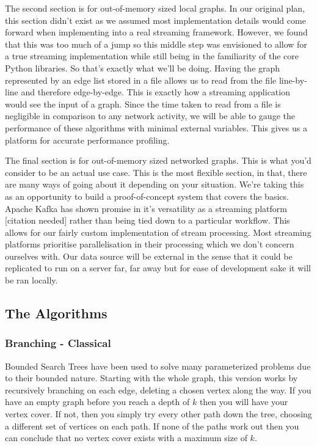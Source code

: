 The second section is for out-of-memory sized local graphs. In our
original plan, this section didn't exist as we assumed most
implementation details would come forward when implementing into a real
streaming framework. However, we found that this was too much of a jump
so this middle step was envisioned to allow for a true streaming
implementation while still being in the familiarity of the core Python
libraries. So that's exactly what we'll be doing. Having the graph
represented by an edge list stored in a file allows us to read from the
file line-by-line and therefore edge-by-edge. This is exactly how a
streaming application would see the input of a graph. Since the time
taken to read from a file is negligible in comparison to any network
activity, we will be able to gauge the performance of these algorithms
with minimal external variables. This gives us a platform for accurate
performance profiling.

The final section is for out-of-memory sized networked graphs. This is
what you'd consider to be an actual use case. This is the most flexible
section, in that, there are many ways of going about it depending on
your situation. We're taking this as an opportunity to build a
proof-of-concept system that covers the basics. Apache Kafka has shown
promise in it's versatility as a streaming platform [citation needed] rather than being
tied down to a particular workflow. This allows for our fairly custom
implementation of stream processing. Most streaming platforms prioritise
parallelisation in their processing which we don't concern ourselves
with. Our data source will be external in the sense that it could be
replicated to run on a server far, far away but for ease of development
sake it will be ran locally.

\subsection{The Algorithms}

\subsubsection{Branching - Classical}

Bounded Search Trees have been used to solve many parameterized problems
due to their bounded nature. Starting with the whole graph, this version
works by recursively branching on each edge, deleting a chosen vertex
along the way. If you have an empty graph before you reach a depth of
\(k\) then you will have your vertex cover. If not, then you simply try
every other path down the tree, choosing a different set of vertices on
each path. If none of the paths work out then you can conclude that no
vertex cover exists with a maximum size of \(k\).

